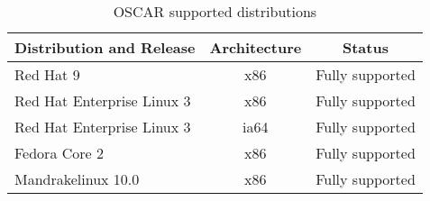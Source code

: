 %
%
%

\begin{table}[htbp]
  \begin{center}
    \begin{tabular}{|l|c|p{3in}|}
      \hline
      \multicolumn{1}{|c|}{Distribution and Release} &
      \multicolumn{1}{|c|}{Architecture} &
      \multicolumn{1}{|c|}{Status} \\
      \hline
      \hline
      Red Hat 9 & x86 &Fully supported \\
%
      Red Hat Enterprise Linux 3 & x86 & Fully supported \\
%
      Red Hat Enterprise Linux 3 & ia64 & Fully supported \\
%
\hline
%
      Fedora Core 2 & x86 & Fully supported \\
%
\hline
%
      Mandrakelinux 10.0 & x86 & Fully supported \\
%
\hline
%
    \end{tabular}
    \caption{OSCAR supported distributions}
    \label{tab:oscar-distro-support}
  \end{center}
\end{table}
